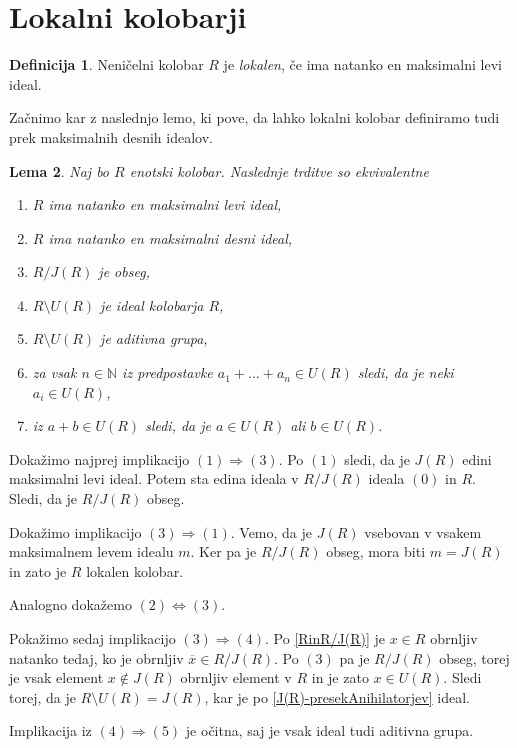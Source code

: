 \documentclass[a4paper, 12pt]{amsart}
\theoremstyle{definition} %
\newtheorem{definicija}{Definicija}[section]
\theoremstyle{plain} %
\newtheorem{lema}[definicija]{Lema}
\newcommand{\N}{\mathbb N}
\begin{document}
\section{Lokalni kolobarji}

\begin{definicija}
Neničelni kolobar $R$ je \emph{lokalen}, če ima natanko en maksimalni levi ideal.
\end{definicija}

Začnimo kar z naslednjo lemo, ki pove, da lahko lokalni kolobar definiramo tudi prek maksimalnih desnih idealov.

\begin{lema}
Naj bo $R$ enotski kolobar. Naslednje trditve so ekvivalentne
\label{classLocal}
\begin{enumerate}
\item $R$ ima natanko en maksimalni levi ideal,
\item $R$ ima natanko en maksimalni desni ideal,
\item $R/J(R)$ je obseg,
\item $R\setminus U(R)$ je ideal kolobarja $R$,
\item $R\setminus U(R)$ je aditivna grupa,
\item za vsak $n\in \N$ iz predpostavke $a_1 + \dots + a_n \in U(R)$ sledi, da je neki $a_i \in U(R)$,
\item iz $a+b\in U(R)$ sledi, da je $a\in U(R)$ ali $b\in U(R)$.
\end{enumerate}
\end{lema}

\proof
Dokažimo najprej implikacijo $(1) \Rightarrow (3)$. Po $(1)$ sledi, da je $J(R)$ edini maksimalni levi ideal. Potem sta edina ideala v $R/J(R)$ ideala $(0)$ in $R$. Sledi, da je $R/J(R)$ obseg.

Dokažimo implikacijo $(3) \Rightarrow (1)$. Vemo, da je $J(R)$ vsebovan v vsakem maksimalnem levem idealu $m$. Ker pa je $R/J(R)$ obseg, mora biti $m=J(R)$ in zato je $R$ lokalen kolobar.

Analogno dokažemo $(2) \Leftrightarrow (3)$.

Pokažimo sedaj implikacijo $(3) \Rightarrow (4)$. Po \ref{RinR/J(R)} je $x\in R$ obrnljiv natanko tedaj, ko je obrnljiv $\overline{x}\in R/J(R)$. Po $(3)$ pa je $R/J(R)$ obseg, torej je vsak element $x\notin J(R)$ obrnljiv element v $R$ in je zato $x\in U(R)$. Sledi torej, da je $R\setminus U(R) = J(R)$, kar je po \ref{J(R)-presekAnihilatorjev} ideal.

Implikacija iz $(4)\Rightarrow (5)$ je očitna, saj je vsak ideal tudi aditivna grupa.
\end{document}
